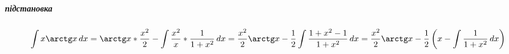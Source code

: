 \documentclass[../rgr1.tex]{subfiles}
\begin{document}
\Solution

\subparagraph{підстановка}
\noindent\begin{varwidth}{\linewidth}
\end{varwidth}

\begin{dmath}
	\int x\arctg x \, dx
	= \arctg x * \frac{x^2}{2} - \int \frac{x^2}{x}*\frac{1}{1+x^2}\, dx
	= \frac{x^2}{2}\arctg x - \frac{1}{2}\int \frac{1+x^2-1}{1+x^2}\, dx
	= \frac{x^2}{2}\arctg x -\frac{1}{2}\left(x-\int\frac{1}{1+x^2}\,dx\right)
\end{dmath}

\end{document}
